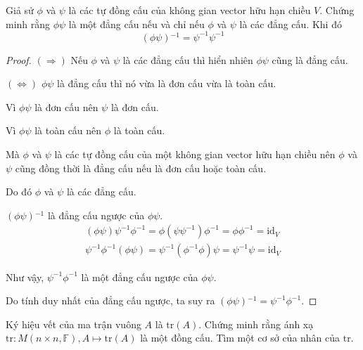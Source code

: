 \documentclass[class=linearalgebra,crop=false]{standalone}
\begin{document}
\begin{exercise}
    Giả sử $\phi$ và $\psi$ là các tự đồng cấu của không gian vector hữu hạn chiều $V$. Chứng minh rằng $\phi\psi$ là một đẳng cấu nếu và chỉ nếu $\phi$ và $\psi$ là các đẳng cấu. Khi đó
    \[
        (\phi\psi){}^{-1} = \psi^{-1}\psi^{-1}
    \]
\end{exercise}

\begin{proof}
    $(\Rightarrow)$ Nếu $\phi$ và $\psi$ là các đẳng cấu thì hiển nhiên $\phi\psi$ cũng là đẳng cấu.
    \par $(\Leftrightarrow)$ $\phi\psi$ là đẳng cấu thì nó vừa là đơn cấu vừa là toàn cấu.
    \par Vì $\phi\psi$ là đơn cấu nên $\psi$ là đơn cấu.
    \par Vì $\phi\psi$ là toàn cấu nên $\phi$ là toàn cấu.
    \par Mà $\phi$ và $\psi$ là các tự đồng cấu của một không gian vector hữu hạn chiều nên $\phi$ và $\psi$ cũng đồng thời là đẳng cấu nếu là đơn cấu hoặc toàn cấu.
    \par Do đó $\phi$ và $\psi$ là các đẳng cấu.
    \bigskip
    \par $(\phi\psi){}^{-1}$ là đẳng cấu ngược của $\phi\psi$.
    \[
        \begin{split}
            (\phi\psi)\psi^{-1}\phi^{-1} = \phi(\psi\psi^{-1})\phi^{-1} = \phi\phi^{-1} = \text{id}_{V} \\
            \psi^{-1}\phi^{-1}(\phi\psi) = \psi^{-1}(\phi^{-1}\phi)\psi = \psi^{-1}\psi = \text{id}_{V}
        \end{split}
    \]
    \par Như vậy, $\psi^{-1}\phi^{-1}$ là một đẳng cấu ngược của $\phi\psi$.
    \par Do tính duy nhất của đẳng cấu ngược, ta suy ra $(\phi\psi){}^{-1} = \psi^{-1}\phi^{-1}$.
\end{proof}

\begin{exercise}
    Ký hiệu vết của ma trận vuông $A$ là $\text{tr}(A)$. Chứng minh rằng ánh xạ $\text{tr}: M(n\times n, \mathbb{F}), A\mapsto \text{tr}(A)$ là một đồng cấu. Tìm một cơ sở của nhân của $\text{tr}$.
\end{exercise}
\end{document}
